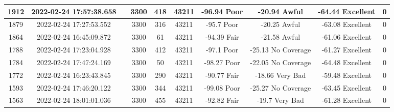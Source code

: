 \begin{longtable*}{|c|c|c|c|c|c|c|c|c|c|}
1912&2022-02-24 17:57:38.658&&3300&418&43211& -96.94    Poor        & -20.94    Awful       & -64.44    Excellent   & 0\\\hline
{}1879&2022-02-24 17:27:53.552&&3300&316&43211& -95.7     Poor        & -20.25    Awful       & -63.08    Excellent   & 0\\\hline
{}1864&2022-02-24 16:45:09.872&&3300&61&43211& -94.39    Fair        & -21.58    Awful       & -61.06    Excellent   & 0\\\hline
{}1788&2022-02-24 17:23:04.928&&3300&412&43211& -97.1     Poor        & -25.13    No Coverage & -61.27    Excellent   & 0\\\hline
{}1784&2022-02-24 17:47:24.169&&3300&50&43211& -98.27    Poor        & -22.05    No Coverage & -64.48    Excellent   & 0\\\hline
{}1772&2022-02-24 16:23:43.845&&3300&290&43211& -90.77    Fair        & -18.66    Very Bad    & -59.48    Excellent   & 0\\\hline
{}1593&2022-02-24 17:46:20.122&&3300&344&43211& -99.08    Poor        & -25.27    No Coverage & -63.45    Excellent   & 0\\\hline
{}1563&2022-02-24 18:01:01.036&&3300&455&43211& -92.82    Fair        & -19.7     Very Bad    & -61.28    Excellent   & 0\\\hline

\end{longtable*}
